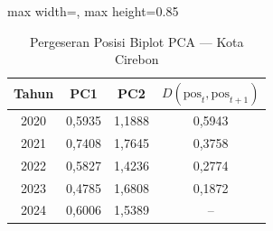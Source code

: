 \begin{table}[H]
\centering
\caption{Pergeseran Posisi Biplot PCA --- Kota Cirebon} \label{tab:appjarak_pca_skor_kota_cirebon}
\begin{adjustbox}{max width=\textwidth, max height=0.85\textheight}
\begin{tabular}{|c|c|c|c|}
\hline
\textbf{Tahun} & \textbf{PC1} & \textbf{PC2} & \textbf{$D(\text{pos}_t, \text{pos}_{t+1})$} \\
\hline
2020 & 0,5935 & 1,1888 & 0,5943 \\
2021 & 0,7408 & 1,7645 & 0,3758 \\
2022 & 0,5827 & 1,4236 & 0,2774 \\
2023 & 0,4785 & 1,6808 & 0,1872 \\
2024 & 0,6006 & 1,5389 & -- \\
\hline
\end{tabular}
\end{adjustbox}
\end{table}